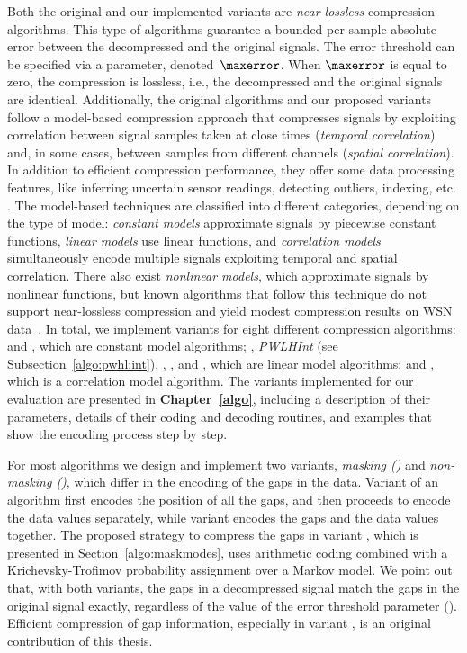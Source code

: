 Both the original and our implemented variants are \textit{near-lossless} compression algorithms. This type of algorithms guarantee a bounded per-sample absolute error between the decompressed and the original signals. The error threshold can be specified via a parameter, denoted~$\maxerror$. When $\maxerror$ is equal to zero, the compression is lossless, i.e., the decompressed and the original signals are identical. Additionally, the original algorithms and our proposed variants follow a model-based compression approach that compresses signals by exploiting correlation between signal samples taken at close times (\textit{temporal correlation}) and, in some cases, between samples from different channels (\textit{spatial correlation}). In addition to efficient compression performance, they offer some data processing features, like inferring uncertain sensor readings, detecting outliers, indexing, etc. \cite{AnEva2013}. The model-based techniques are classified into different categories, depending on the type of model: \textit{constant models} approximate signals by piecewise constant functions, \textit{linear models} use linear functions, and \textit{correlation models} simultaneously encode multiple signals exploiting temporal and spatial correlation. There also exist \textit{nonlinear models}, which approximate signals by nonlinear functions, but known algorithms that follow this technique do not support near-lossless compression and yield modest compression results on WSN data~\cite{AnEva2013, Signal2016}. In total, we implement variants for eight different compression algorithms: \textit{\PCAfull} \cite{coder:pca} and \textit{\APCAfull} \cite{coder:apca}, which are constant model algorithms; \textit{\PWLHfull} \cite{coder:pwlh}, \textit{PWLHInt} (see Subsection~\ref{algo:pwhl:int}), \textit{\CAfull} \cite{coder:ca}, \textit{\SFfull} \cite{coder:sf}, and \textit{\FRfull} \cite{coder:fr}, which are linear model algorithms; and \textit{\GAMPSfull} \cite{coder:gamps}, which is a correlation model algorithm. The variants implemented for our evaluation are presented in \textbf{Chapter~\ref{algo}}, including a description of their parameters, details of their coding and decoding routines, and examples that show the encoding process step by step.


For most algorithms we design and implement two variants, \textit{masking (\maskalgo)} and \textit{non-masking (\NOmaskalgo)}, which differ in the encoding of the gaps in the data. Variant \maskalgo of an algorithm first encodes the position of all the gaps, and then proceeds to encode the data values separately, while variant \NOmaskalgo encodes the gaps and the data values together. The proposed strategy to compress the gaps in variant \maskalgo, which is presented in Section~\ref{algo:maskmodes}, uses arithmetic coding \cite{ac2, Cover2005} combined with a Krichevsky-Trofimov probability assignment \cite{ktestimator} over a Markov model. We point out that, with both variants, the gaps in a decompressed signal match the gaps in the original signal exactly, regardless of the value of the error threshold parameter (\maxerror). Efficient compression of gap information, especially in variant \maskalgo, is an original contribution of this thesis.


